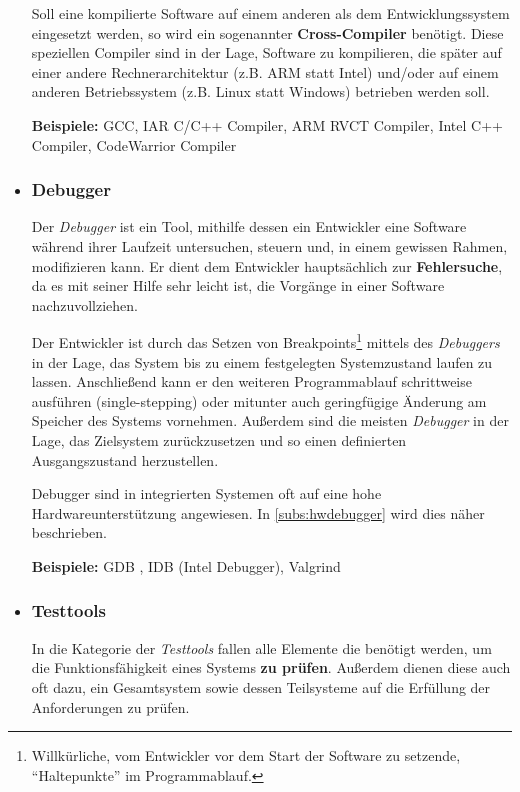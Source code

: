 \begin{itemize}
  Soll eine kompilierte Software auf einem anderen als dem Entwicklungssystem
  eingesetzt werden, so wird ein sogenannter \textbf{Cross-Compiler} benötigt.
  Diese speziellen Compiler sind in der Lage, Software zu kompilieren, die
  später auf einer andere Rechnerarchitektur (z.B. ARM statt Intel) und/oder auf
  einem anderen Betriebssystem (z.B. Linux statt Windows) betrieben werden soll.
  
  \textbf{Beispiele:} GCC, IAR C/C++ Compiler, ARM RVCT Compiler, Intel C++
  Compiler, CodeWarrior Compiler
  \item \subsubsection*{Debugger}\label{subs:swdebugger} Der \emph{Debugger} ist
  ein Tool, mithilfe dessen ein Entwickler eine Software während ihrer Laufzeit
  untersuchen, steuern und, in einem gewissen Rahmen, modifizieren kann. Er
  dient dem Entwickler hauptsächlich zur \textbf{Fehlersuche}, da es mit seiner
  Hilfe sehr leicht ist, die Vorgänge in einer Software nachzuvollziehen.
  
  Der Entwickler ist durch das Setzen von Breakpoints\footnote{Willkürliche,
  vom Entwickler vor dem Start der Software zu setzende, "`Haltepunkte"' im
  Programmablauf.} mittels des \emph{Debuggers} in der Lage, das System bis zu
  einem festgelegten Systemzustand laufen zu lassen. Anschließend kann
  er den weiteren Programmablauf schrittweise ausführen (single-stepping)
  oder mitunter auch geringfügige Änderung am Speicher des Systems vornehmen.
  Außerdem sind die meisten \emph{Debugger} in der Lage, das Zielsystem
  zurückzusetzen und so einen definierten Ausgangszustand herzustellen.
  
  Debugger sind in integrierten Systemen oft auf eine hohe Hardwareunterstützung
  angewiesen. In \autoref{subs:hwdebugger} wird dies näher beschrieben.
  
  \textbf{Beispiele:} GDB , IDB (Intel Debugger), Valgrind
  \item \subsubsection*{Testtools} In die Kategorie der \emph{Testtools} fallen
  alle Elemente die benötigt werden, um die Funktionsfähigkeit eines Systems
  \textbf{zu prüfen}. Außerdem dienen diese auch oft dazu, ein Gesamtsystem
  sowie dessen Teilsysteme auf die Erfüllung der Anforderungen zu prüfen.
  

\end{itemize}
